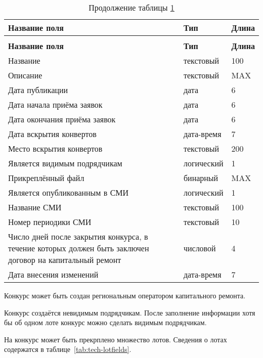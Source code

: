 \begin{footnotesize}
\begin{longtable}[h]{|p{}|p{}|p{}|}
	\caption{\label{tab:tech-contestfields}Сведения о конкурсе} \\
	\hline
		\textbf{Название поля} & \textbf{Тип} & \textbf{Длина} \\
	\hline \endfirsthead
	\caption*{Продолжение таблицы \ref{tab:tech-contestfields}}\\
	\hline
		\textbf{Название поля} & \textbf{Тип} & \textbf{Длина} \\
	\hline \endhead
		Название & текстовый & 100 \\
	\hline
		Описание & текстовый & MAX \\
	\hline
		Дата публикации & дата & 6 \\
	\hline
		Дата начала приёма заявок & дата & 6 \\
	\hline
		Дата окончания приёма заявок & дата & 6 \\
	\hline
		Дата вскрытия конвертов & дата-время & 7 \\
	\hline
		Место вскрытия конвертов & текстовый & 200 \\
	\hline
		Является видимым подрядчикам & логический & 1 \\
	\hline
		Прикреплённый файл & бинарный & MAX \\
	\hline
		Является опубликованным в СМИ & логический & 1 \\
	\hline
		Название СМИ & текстовый & 100 \\
	\hline
		Номер периодики СМИ & текстовый & 10 \\
	\hline
		Число дней после закрытия конкурса, в течение которых должен быть заключен договор на капитальный ремонт & числовой & 4 \\
	\hline
		Дата внесения изменений & дата-время & 7 \\
	\hline
\end{longtable}
\end{footnotesize}

Конкурс может быть создан региональным оператором капитального ремонта.

Конкурс создаётся невидимым подрядчикам.
После заполнение информации хотя бы об одном лоте конкурс можно сделать видимым подрядчикам.

На конкурс может быть прекрплено множество лотов.
Сведения о лотах содержатся в таблице~\ref{tab:tech-lotfields}.

